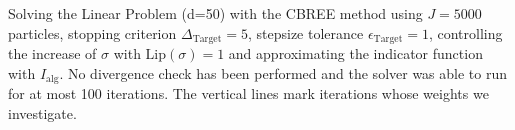 Solving the Linear Problem (d=50) with the CBREE method using  $J = 5000$ particles, stopping criterion $\Delta_{\text{Target}} = 5$, stepsize tolerance $\epsilon_{\text{Target}} = 1$, controlling the increase of $\sigma$ with $\text{Lip}(\sigma) = 1$ and approximating the indicator function with $I_\text{alg}$. No divergence check has been performed and the solver was able to run for at most 100 iterations. The vertical lines mark iterations whose weights we investigate.